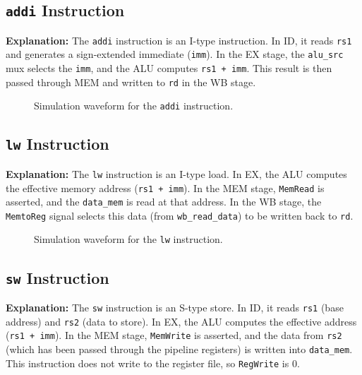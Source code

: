 \documentclass{article}
\begin{document}
\subsection{\texttt{addi} Instruction}
\textbf{Explanation:} The \texttt{addi} instruction is an I-type instruction. In ID, it reads \texttt{rs1} and generates a sign-extended immediate (\texttt{imm}). In the EX stage, the \texttt{alu\_src} mux selects the \texttt{imm}, and the ALU computes \texttt{rs1 + imm}. This result is then passed through MEM and written to \texttt{rd} in the WB stage.

\begin{figure}[H]
    \centering
    \caption{Simulation waveform for the \texttt{addi} instruction.}
    \label{fig:addi_sim}
\end{figure}

\subsection{\texttt{lw} Instruction}
\textbf{Explanation:} The \texttt{lw} instruction is an I-type load. In EX, the ALU computes the effective memory address (\texttt{rs1 + imm}). In the MEM stage, \texttt{MemRead} is asserted, and the \texttt{data\_mem} is read at that address. In the WB stage, the \texttt{MemtoReg} signal selects this data (from \texttt{wb\_read\_data}) to be written back to \texttt{rd}.

\begin{figure}[H]
    \centering
    \caption{Simulation waveform for the \texttt{lw} instruction.}
    \label{fig:lw_sim}
\end{figure}

\subsection{\texttt{sw} Instruction}
\textbf{Explanation:} The \texttt{sw} instruction is an S-type store. In ID, it reads \texttt{rs1} (base address) and \texttt{rs2} (data to store). In EX, the ALU computes the effective address (\texttt{rs1 + imm}). In the MEM stage, \texttt{MemWrite} is asserted, and the data from \texttt{rs2} (which has been passed through the pipeline registers) is written into \texttt{data\_mem}. This instruction does not write to the register file, so \texttt{RegWrite} is 0.
\end{document}
